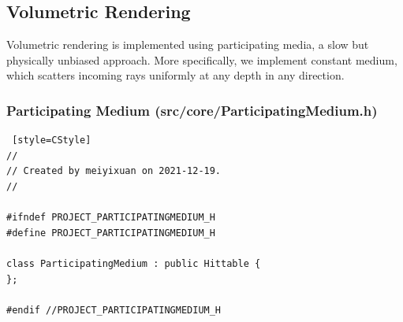 \documentclass[utf8]{article}
\begin{document}
\subsection{Volumetric Rendering}
Volumetric rendering is implemented using participating media, a slow but physically unbiased approach. More specifically, we implement constant medium, which scatters incoming rays uniformly at any depth in any direction.
\subsubsection*{Participating Medium (src/core/ParticipatingMedium.h)}
\begin{lstlisting} [style=CStyle]
//
// Created by meiyixuan on 2021-12-19.
//

#ifndef PROJECT_PARTICIPATINGMEDIUM_H
#define PROJECT_PARTICIPATINGMEDIUM_H

class ParticipatingMedium : public Hittable {
};

#endif //PROJECT_PARTICIPATINGMEDIUM_H

\end{lstlisting}
\end{document}
